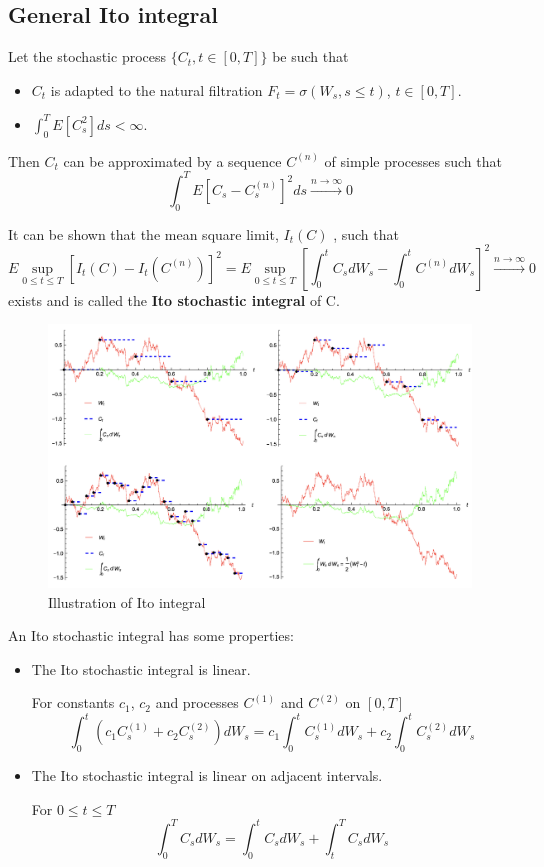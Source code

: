 \documentclass[11pt,a4paper]{book}
\theoremstyle{definition}\newtheorem{definition}{Definition}
\theoremstyle{definition}\newtheorem{fact}{Fact}
\theoremstyle{definition}\newtheorem{remark}{Remark}
\theoremstyle{definition}\newtheorem{ex}{Ex.}
\theoremstyle{definition}\newtheorem{project}{Project}
\theoremstyle{definition}\newtheorem{problem}{Problem}
\theoremstyle{definition}\newtheorem{example}{Example}
\numberwithin{theorem}{section}
\numberwithin{corollary}{chapter}
\numberwithin{assumption}{chapter}
\numberwithin{definition}{chapter}
\numberwithin{prop}{chapter}
\numberwithin{notation}{chapter}
\numberwithin{problem}{chapter}
\numberwithin{example}{chapter}
\numberwithin{fact}{chapter}
\numberwithin{ex}{chapter}
\begin{document}
\subsection{General Ito integral}
Let the stochastic process $\{C_t, t\in [0, T]\}$ be such that
\begin{itemize}
\item $C_t$ is adapted to the natural filtration $F_t = \sigma (W_s, s \leq t)$, $t \in [0,T]$.
\item $\int_0^T E[C_s^2] ds < \infty$.
\end{itemize}

Then $C_t$ can be approximated by a sequence $C^{(n)}$ of simple processes such that
$$ \int_0^T E[C_s - C_s^{(n)}]^2 ds \xrightarrow{n \rightarrow \infty} 0 $$

It can be shown that the mean square limit, $I_t(C)$ , such that
$$ E \sup_{0 \leq t \leq T} [I_t(C) - I_t(C^{(n)})]^2 = E \sup_{0 \leq t \leq T} [\int_0^t C_s dW_s - \int_0^t C^{(n)} dW_s]^2 \xrightarrow{n \rightarrow \infty} 0 $$
exists and is called the \textbf{Ito stochastic integral} of C.

\begin{figure}[H]
	\centering
	\includegraphics[scale=0.4]{Chapter02/Chapter2_1.png}
	\caption{Illustration of Ito integral}
\end{figure}

An Ito stochastic integral has some properties:
\begin{itemize}
\item The Ito stochastic integral is linear.

For constants $c_1$, $c_2$ and processes $C^{(1)}$ and $C^{(2)}$ on $[0, T]$
$$ \int_0^t (c_1 C_s^{(1)} + c_2 C_s^{(2)}) dW_s = c_1 \int_0^t C_s^{(1)} dW_s + c_2 \int_0^t C_s^{(2)} dW_s $$
\item The Ito stochastic integral is linear on adjacent intervals.

For $0 \leq t \leq T$
$$ \int_0^T C_s dW_s = \int_0^t C_s dW_s + \int_t^T C_s dW_s $$
\end{itemize}
\end{document}
